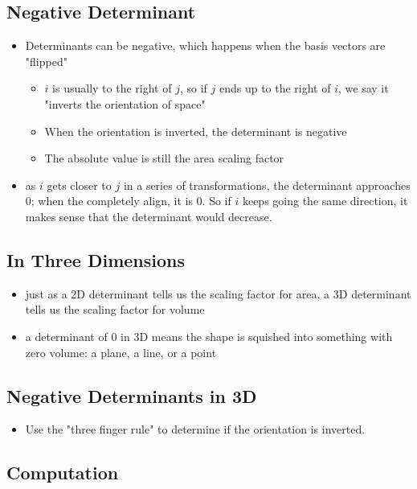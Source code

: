 \subsection{Negative Determinant}
\begin{itemize}
    \item Determinants can be negative, which happens when the basis vectors are "flipped"
    \begin{itemize}
        \item $i$ is usually to the right of $j$, so if $j$ ends up to the right of $i$, we say it "inverts the orientation of space"
        \item When the orientation is inverted, the determinant is negative
        \item The absolute value is still the area scaling factor
    \end{itemize}
    \item as $i$ gets closer to $j$ in a series of transformations, the determinant approaches 0; when the completely align, it is 0. So if $i$ keeps going the same direction, it makes sense that the determinant would decrease.
\end{itemize}

\subsection{In Three Dimensions}
\begin{itemize}
    \item just as a 2D determinant tells us the scaling factor for area, a 3D determinant tells us the scaling factor for volume
    \item a determinant of 0 in 3D means the shape is squished into something with zero volume: a plane, a line, or a point 
\end{itemize}

\subsection{Negative Determinants in 3D}
\begin{itemize}
    \item Use the "three finger rule" to determine if the orientation is inverted. 
\end{itemize}

\subsection{Computation}
